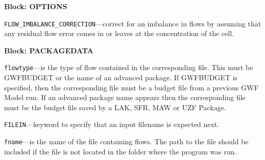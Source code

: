 
\item \textbf{Block: OPTIONS}

\begin{description}
\item \texttt{FLOW\_IMBALANCE\_CORRECTION}---correct for an imbalance in flows by assuming that any residual flow error comes in or leaves at the concentration of the cell.

\end{description}
\item \textbf{Block: PACKAGEDATA}

\begin{description}
\item \texttt{flowtype}---is the type of flow contained in the corresponding file.  This must be GWFBUDGET or the name of an advanced package.  If GWFBUDGET is specified, then the corresponding file must be a budget file from a previous GWF Model run.  If an advanced package name appears then the corresponding file must be the budget file saved by a LAK, SFR, MAW or UZF Package.

\item \texttt{FILEIN}---keyword to specify that an input filename is expected next.

\item \texttt{fname}---is the name of the file containing flows.  The path to the file should be included if the file is not located in the folder where the program was run.

\end{description}

